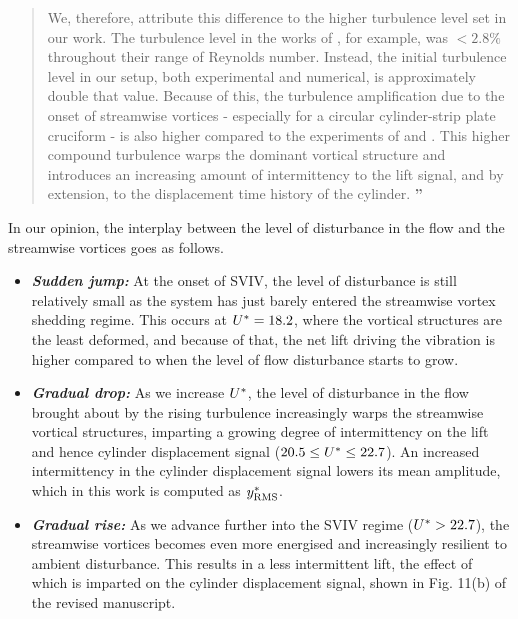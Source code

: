 \documentclass[10pt]{article}
\begin{document}
{  \begin{quotation}
     We, therefore, attribute this difference to the higher turbulence level set in our work. The turbulence level in the works of \citet{Nguyen2012}, for example, was  $<2.8\%$ throughout their range of Reynolds number. Instead, the initial turbulence level in our setup, both experimental and numerical, is approximately double that value. Because of this, the turbulence amplification due to the onset of streamwise vortices  \citep{Zhao2018a} - especially for a circular cylinder-strip plate cruciform \citep{Koide2017} - is also higher compared to the experiments of \citet{Nguyen2012} and \citet{Koide2013}. This higher compound turbulence warps the dominant vortical structure and introduces an increasing amount of intermittency to the lift signal, and by extension, to the displacement time history of the cylinder. {\Large \textbf{''}}
   \end{quotation}

   \noindent In our opinion, the interplay between the level of disturbance in the flow and the streamwise vortices goes as follows.

   \begin{itemize}
     \item \textbf{\textit{Sudden jump:}} At the onset of SVIV, the level of disturbance is still relatively small as the system has just barely entered the streamwise vortex shedding regime. This occurs at $U^{*} = 18.2$, where the vortical structures are the least deformed, and because of that, the net lift driving the vibration is higher compared to when the level of flow disturbance starts to grow.
     \item \textbf{\textit{Gradual drop:}} As we increase $U^{*}$, the level of disturbance in the flow brought about by the rising turbulence increasingly warps the streamwise vortical structures, imparting a growing degree of intermittency on the lift and hence cylinder displacement signal ($20.5 \leq U^{*} \leq 22.7$). An increased intermittency in the cylinder displacement signal lowers its mean amplitude, which in this work is computed as $y^{*}_{\text{RMS}}$.
     \item \textbf{\textit{Gradual rise:}} As we advance further into the SVIV regime ($U^{*} > 22.7$), the streamwise vortices becomes even more energised and increasingly resilient to ambient disturbance. This results in a less intermittent lift, the effect of which is imparted on the cylinder displacement signal, shown in Fig. 11(b) of the revised manuscript.
   \end{itemize}

}
\end{document}
